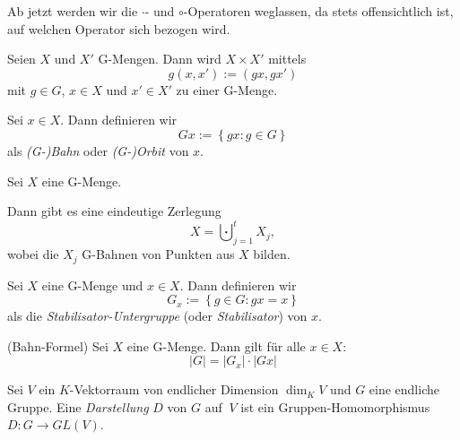 \documentclass[10p,a4paper,BCOR = 12mm, DIV=15]{scrbook}
\begin{document}
{\begin{Bem}
Ab jetzt werden wir die $\cdot$- und $\circ$-Operatoren weglassen, da stets offensichtlich ist, auf welchen Operator sich bezogen wird.
\end{Bem}

\begin{Bem}
\label{bem:produkt_G-Mengen}
Seien $X$ und $X'$ G-Mengen. Dann wird $X \times X'$ mittels
\begin{displaymath}
g \left(x, x'\right) := \left(g x, g x'\right)
\end{displaymath}
mit $g \in G$, $x \in X$ und $x' \in X'$ zu einer G-Menge.
\end{Bem}

\begin{Def}
Sei $x \in X$. Dann definieren wir
\begin{displaymath}
G x := \left\{g x: g \in G\right\}
\end{displaymath}
als \emph{(G-)Bahn} oder \emph{(G-)Orbit} von $x$.
\end{Def}

\begin{Bem}
\label{bem:gbahnen}
Sei $X$ eine G-Menge.

Dann gibt es eine eindeutige Zerlegung
\begin{displaymath}
X = \bigcupdot_{j=1}^t X_j,
\end{displaymath}
wobei die $X_j$ G-Bahnen von Punkten aus $X$ bilden.
\end{Bem}

\begin{Def}
Sei $X$ eine G-Menge und $x \in X$. Dann definieren wir
\begin{displaymath}
G_x := \left\{g \in G: g x = x\right\}
\end{displaymath}
als die \emph{Stabilisator-Untergruppe} (oder \emph{Stabilisator}) von $x$.
\end{Def}

\begin{Le} (Bahn-Formel)
\label{le:bahnformel}
Sei $X$ eine G-Menge. Dann gilt für alle $x\in X$:
\begin{displaymath}
\left|G\right| = \left|G_x\right| \cdot \left|G x\right|
\end{displaymath}
\end{Le}

\begin{Def}
\label{def:darstellung}
Sei $V$ ein $K$-Vektorraum von endlicher Dimension $\dim_K V$ und $G$ eine endliche Gruppe. Eine \emph{Darstellung} $D$ von $G$ auf $\ V$ ist ein Gruppen-Homo\-mor\-phismus $D: G \rightarrow GL\left(V\right)$.


\end{Def}}
\end{document}
